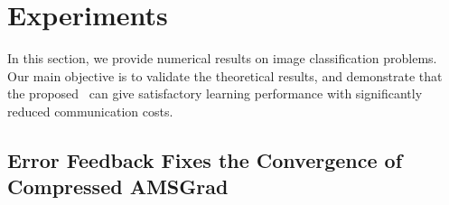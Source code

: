 \documentclass[11pt]{article}
\begin{document}









\section{Experiments}\label{sec:experiment}

In this section, we provide numerical results on image classification problems. Our main objective is to validate the theoretical results, and demonstrate that the proposed \algo\ can give satisfactory learning performance with significantly reduced communication costs. 

\subsection{Error Feedback Fixes the Convergence of Compressed AMSGrad}
\end{document}
